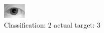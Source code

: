 \begin{figure}[h!]
\begin{center}
\includegraphics[width=0.60\columnwidth]{figures/ID1166_class_2_target_3.png}
\end{center}
\caption{ Classification: 2 actual target: 3}
\label{fig:ID1166_class_2_target_3}
\end{figure}
